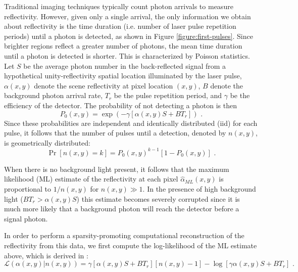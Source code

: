 Traditional imaging techniques typically count photon arrivals to measure reflectivity. However, given only a single arrival, the only information we obtain about reflectivity is the time duration (i.e. number of laser pulse repetition periods) until a photon is detected, as shown in Figure \ref{figure:first-pulses}. Since brighter regions reflect a greater number of photons, the mean time duration until a photon is detected is shorter. This is characterized by Poisson statistics. Let $S$ be the average photon number in the back-reflected signal from a hypothetical unity-reflectivity spatial location illuminated by the laser pulse, $\alpha(x,y)$ denote the scene reflectivity at pixel location $(x,y)$, $B$ denote the background photon arrival rate, $T_r$ be the pulse repetition period, and $\gamma$ be the efficiency of the detector. The probability of not detecting a photon is then
\begin{equation}
P_0(x, y) = \exp\left(-\gamma[\alpha(x,y)S + BT_r]\right)\,\,.
\end{equation}
Since these probabilities are independent and identically distributed (iid) for each pulse, it follows that the number of pulses until a detection, denoted by $n(x, y)$, is geometrically distributed:
\begin{equation}
\operatorname{Pr}\left[n(x,y) = k \right] = P_0(x,y)^{k-1} \left[ 1 - P_0(x,y) \right]\,\,.
\end{equation}

When there is no background light present, it follows that the maximum likelihood (ML) estimate of the reflectivity at each pixel $\hat{\alpha}_{ML}(x,y)$ is proportional to $1/n(x,y)$ for $n(x,y) \gg 1$. In the presence of high background light ($B T_r > \alpha(x,y) S$) this estimate becomes severely corrupted since it is much more likely that a background photon will reach the detector before a signal photon.

In order to perform a sparsity-promoting computational reconstruction of the reflectivity from this data, we first compute the log-likelihood of the ML estimate above, which is derived in \cite{kirmani-first}:
\begin{equation}
\mathcal{L}\left( \alpha(x,y) | n(x,y) \right) = \gamma \left[ \alpha(x,y) S + B T_r \right] \left[ n(x,y) - 1 \right] - \log \left[ \gamma \alpha(x,y) S + B T_r \right]\,\,.
\end{equation}

